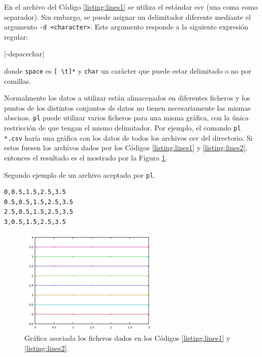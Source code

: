 \documentclass{article}
\begin{document}
		En el archivo del Código \ref{listing:lines1} se utiliza el estándar csv (una coma como separador). Sin embargo, se puede asignar un delimitador diferente mediante el argumento \texttt{-d <character>}. Este argumento responde a la siguiente expresión regular:
		
		|-d{space}{char}|

		donde \texttt{space} es \texttt{[ \textbackslash t]*}	y \texttt{char} un carácter que puede estar delimitado o no por comillas.
 
		Normalmente los datos a utilizar están almacenados en diferentes ficheros y los puntos de los distintos conjuntos de datos no tienen necesariamente las mismas abscisas. \texttt{pl} puede utilizar varios ficheros para una misma gráfica, con la única restricción de que tengan el mismo delimitador. Por ejemplo, el comando \texttt{pl *.csv} haría una gráfica con los datos de todos los archivos csv del directorio. Si estos fuesen los archivos dados por los Códigos \ref{listing:lines1} y \ref{listing:lines2}, entonces el resultado es el mostrado por la Figura \ref{fig:lines1-lines2}.

		\begin{listing}
			\caption{Segundo ejemplo de un archivo aceptado por \texttt{pl}.}
			\begin{verbatim}
0,0.5,1.5,2.5,3.5
0.5,0.5,1.5,2.5,3.5
2.5,0.5,1.5,2.5,3.5
3,0.5,1.5,2.5,3.5
			\end{verbatim}
			\label{listing:lines2}
		\end{listing}

        \begin{figure}[H]
        	\centering
        	\includegraphics[width=0.6\textwidth]{../../images/both_lines.png}
        	\caption{Gráfica asociada los ficheros dados en los Códigos \ref{listing:lines1} y \ref{listing:lines2}.}
        	\label{fig:lines1-lines2}
        \end{figure}
\end{document}
